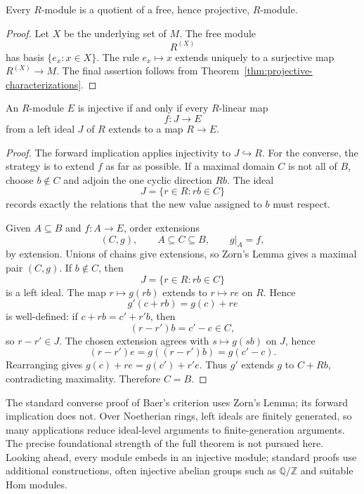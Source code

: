 \begin{proposition}\label{prop:enough-projectives}
Every \(R\)-module is a quotient of a free, hence projective, \(R\)-module.
\end{proposition}
\begin{proof}
Let \(X\) be the underlying set of \(M\).  The free module
\[
R^{(X)}
\]
has basis \(\{e_x:x\in X\}\).  The rule \(e_x\mapsto x\) extends uniquely to
a surjective map \(R^{(X)}\to M\).  The final assertion follows from
Theorem~\ref{thm:projective-characterizations}.
\end{proof}

\begin{theorem}\label{thm:baer-criterion}
An \(R\)-module \(E\) is injective if and only if every \(R\)-linear map
\[
f:J\longrightarrow E
\]
from a left ideal \(J\) of \(R\) extends to a map \(R\to E\).
\end{theorem}
\begin{proof}
The forward implication applies injectivity to \(J\hookrightarrow R\).
For the converse, the strategy is to extend \(f\) as far as possible.  If a
maximal domain \(C\) is not all of \(B\), choose \(b\notin C\) and adjoin the
one cyclic direction \(Rb\).  The ideal
\[
J=\{r\in R:rb\in C\}
\]
records exactly the relations that the new value assigned to \(b\) must
respect.

Given \(A\subseteq B\) and \(f:A\to E\), order extensions
\[
(C,g),\qquad A\subseteq C\subseteq B,\qquad g|_A=f,
\]
by extension.  Unions of chains give extensions, so Zorn's Lemma gives a
maximal pair \((C,g)\).  If \(b\notin C\), then
\[
J=\{r\in R:rb\in C\}
\]
is a left ideal.  The map \(r\mapsto g(rb)\) extends to \(r\mapsto re\) on
\(R\).  Hence
\[
g'(c+rb)=g(c)+re
\]
is well-defined: if \(c+rb=c'+r'b\), then
\[
(r-r')b=c'-c\in C,
\]
so \(r-r'\in J\).  The chosen extension agrees with
\(s\mapsto g(sb)\) on \(J\), hence
\[
(r-r')e=g((r-r')b)=g(c'-c).
\]
Rearranging gives \(g(c)+re=g(c')+r'e\).  Thus \(g'\) extends \(g\) to
\(C+Rb\), contradicting maximality.  Therefore \(C=B\).
\end{proof}

\begin{remark}
The standard converse proof of Baer's criterion uses Zorn's Lemma; its
forward implication does not.  Over Noetherian rings, left ideals are
finitely generated, so many applications reduce ideal-level arguments to
finite-generation arguments.  The precise foundational strength of the full
theorem is not pursued here.  Looking ahead, every module embeds in an
injective module; standard proofs use additional constructions, often
injective abelian groups such as \(\mathbb Q/\mathbb Z\) and suitable Hom
modules.
\end{remark}

